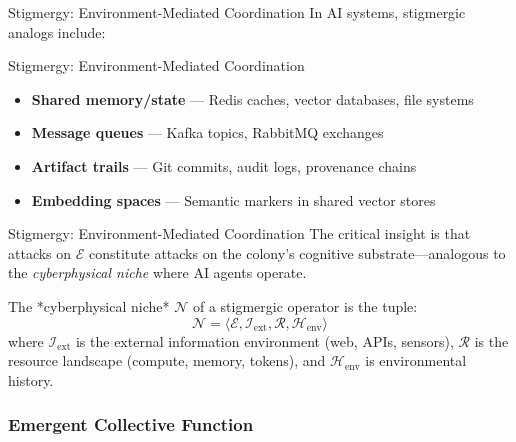 \documentclass[
  ignorenonframetext,
]{beamer}
\providecommand{\tightlist}{%
  \setlength{\itemsep}{0pt}\setlength{\parskip}{0pt}}
\begin{document}
\begin{frame}[allowframebreaks]{Stigmergy: Environment-Mediated
Coordination}
In AI systems, stigmergic analogs include:

\end{frame}

\begin{frame}[allowframebreaks]{Stigmergy: Environment-Mediated
Coordination}
\begin{itemize}
\tightlist
\item
  \textbf{Shared memory/state} --- Redis caches, vector databases, file
  systems
\item
  \textbf{Message queues} --- Kafka topics, RabbitMQ exchanges
\item
  \textbf{Artifact trails} --- Git commits, audit logs, provenance
  chains
\item
  \textbf{Embedding spaces} --- Semantic markers in shared vector stores
\end{itemize}

\end{frame}

\begin{frame}[allowframebreaks]{Stigmergy: Environment-Mediated
Coordination}
The critical insight is that attacks on \(\mathcal{E}\) constitute
attacks on the colony's cognitive substrate---analogous to the
\emph{cyberphysical niche} where AI agents operate.

\begin{definition}
\label{def:cyberphysical-niche}
The *cyberphysical niche* $\mathcal{N}$ of a stigmergic operator is the tuple:
\begin{equation}
\label{eq:niche}
\mathcal{N} = \langle \mathcal{E}, \mathcal{I}_{\text{ext}}, \mathcal{R}, \mathcal{H}_{\text{env}} \rangle
\end{equation}
where $\mathcal{I}_{\text{ext}}$ is the external information environment (web, APIs, sensors), $\mathcal{R}$ is the resource landscape (compute, memory, tokens), and $\mathcal{H}_{\text{env}}$ is environmental history.
\end{definition}
\end{frame}

\subsubsection{Emergent Collective Function}\label{sec:emergence}
\end{document}
